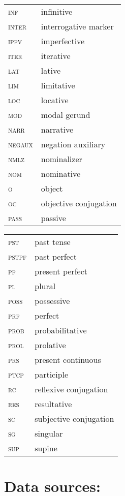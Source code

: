 \documentclass[output=paper]{LSP/langsci}
\begin{document}
\begin{tabularx}{.45\textwidth}{lQ}
\textsc{inf} & infinitive\\
\textsc{inter} & interrogative marker\\
\textsc{ipfv} & imperfective\\
\textsc{iter} & iterative\\
\textsc{lat} & lative\\
\textsc{lim} & limitative\\
\textsc{loc} & locative\\
\textsc{mod} & modal gerund\\
\textsc{narr} & narrative\\
\textsc{negaux} & negation auxiliary\\
\textsc{nmlz} & nominalizer\\
\textsc{nom} & nominative\\
\textsc{o} & object\\
\textsc{oc} & objective conjugation\\
\textsc{pass} & passive\\
\end{tabularx}
\begin{tabularx}{.45\textwidth}{lQ}
\textsc{pst} & past tense\\
\textsc{pstpf} & past perfect\\
\textsc{pf} & present perfect\\
\textsc{pl} & plural\\
\textsc{poss} & possessive\\
\textsc{prf} & perfect\\
\textsc{prob} & probabilitative\\
\textsc{prol} & prolative\\
\textsc{prs} & present continuous\\
\textsc{ptcp} & participle\\
\textsc{rc} & reflexive conjugation\\
\textsc{res} & resultative\\
\textsc{sc} & subjective conjugation\\
\textsc{sg} & singular\\
\textsc{sup} & supine\\
\end{tabularx}


\section*{Data sources:}%
\end{document}
